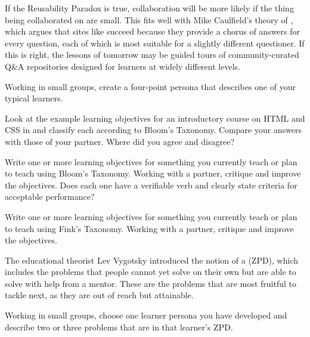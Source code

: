 If the Reusability Paradox is true,
collaboration will be more likely
if the thing being collaborated on are small.
This fits well with Mike Caulfield's theory of
,
which argues that sites like  succeed because
they provide a chorus of answers for every question,
each of which is most suitable for a slightly different questioner.
If this is right,
the lessons of tomorrow may be guided tours of community-curated Q\&A repositories
designed for learners at widely different levels.



Working in small groups,
create a four-point persona that describes one of your typical learners.


Look at the example learning objectives
for an introductory course on HTML and CSS in 
and classify each according to Bloom's Taxonomy.
Compare your answers with those of your partner.
Where did you agree and disagree?


Write one or more learning objectives
for something you currently teach or plan to teach
using Bloom's Taxonomy.
Working with a partner,
critique and improve the objectives.
Does each one have a verifiable verb
and clearly state criteria for acceptable performance?


Write one or more learning objectives
for something you currently teach or plan to teach
using Fink's Taxonomy.
Working with a partner,
critique and improve the objectives.


The educational theorist Lev Vygotsky introduced the notion of a  (ZPD),
which includes the problems that people cannot yet solve on their own
but are able to solve with help from a mentor.
These are the problems that are most fruitful to tackle next,
as they are out of reach but attainable.

Working in small groups,
choose one learner persona you have developed
and describe two or three problems that are in that learner's ZPD.

